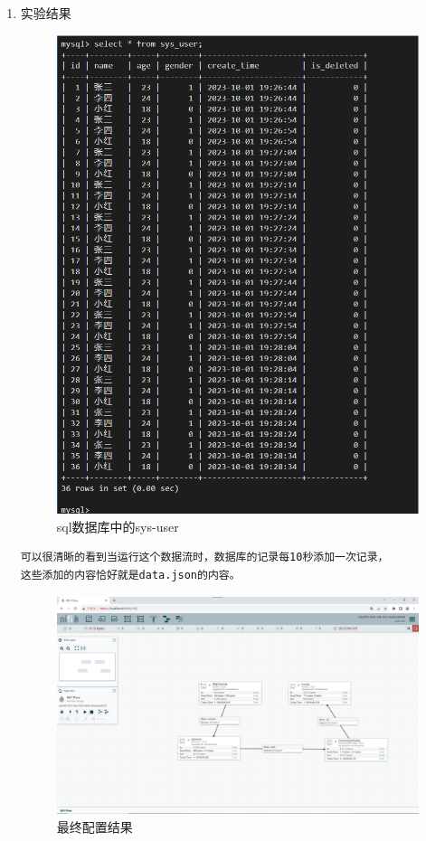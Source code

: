 \documentclass{article}
\begin{document}
\begin{enumerate}
    \item 实验结果
    \begin{figure}[htp]
        \centering
        \includegraphics[width=13cm]{re_database.png}
        \caption{sql数据库中的sys-user}
        \label{pic6}
    \end{figure}
    \begin{lstlisting}
可以很清晰的看到当运行这个数据流时，数据库的记录每10秒添加一次记录，
这些添加的内容恰好就是data.json的内容。
    \end{lstlisting}
    \begin{figure}[htp]
        \centering
        \includegraphics[width=13cm]{re_web_nifi.png}
        \caption{最终配置结果}
        \label{pic6}
    \end{figure}
    \newpage
\end{enumerate}
\end{document}
